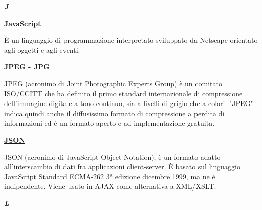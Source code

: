 \newpage

\cleardoublepage
{}
{}
\noindent\hrulefill\hspace{4mm}\textbf{\textsl{\Huge{J}}}\hspace{4mm}\hrulefill

\vspace*{2\bigskipamount}

\begin{addmargin}[0em]{0em}	
	\textbf{\underline{JavaScript}}
\end{addmargin}

\medskip
\begin{addmargin}[5em]{1em}
È un linguaggio di programmazione interpretato sviluppato da Netscape orientato agli oggetti e agli eventi.
\end{addmargin}
	
\bigskip
\begin{addmargin}[0em]{0em}	
	\textbf{\underline{JPEG - JPG}}
\end{addmargin}

\medskip
\begin{addmargin}[5em]{1em}
JPEG (acronimo di Joint Photographic Experts Group) è un comitato ISO/CCITT che ha definito il primo standard internazionale di compressione dell'immagine digitale a tono continuo, sia a livelli di grigio che a colori.
"JPEG" indica quindi anche il diffusissimo formato di compressione a perdita di informazioni ed è un formato aperto e ad implementazione gratuita.
\end{addmargin}	

\bigskip
\begin{addmargin}[0em]{0em}	
	\textbf{\underline{JSON}}
\end{addmargin}

\medskip
\begin{addmargin}[5em]{1em}
JSON (acronimo di JavaScript Object Notation), è un formato adatto all'interscambio di dati fra applicazioni client-server. È basato sul linguaggio JavaScript Standard ECMA-262 3ª edizione dicembre 1999, ma ne è indipendente. Viene usato in AJAX come alternativa a XML/XSLT.
\end{addmargin}

\newpage

\cleardoublepage
{}
{}
\noindent\hrulefill\hspace{4mm}\textbf{\textsl{\Huge{L}}}\hspace{4mm}\hrulefill

